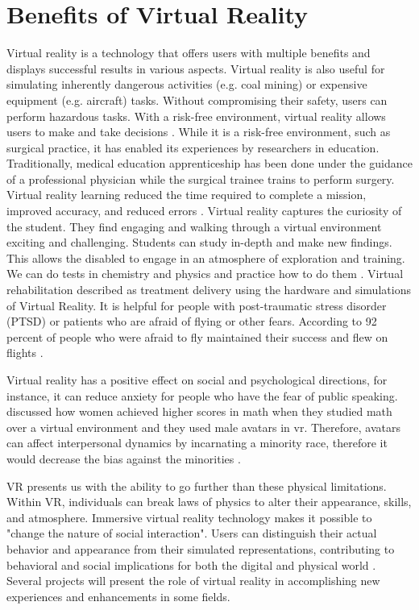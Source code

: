   
\section{Benefits of Virtual Reality}

Virtual reality is a technology that offers users with multiple benefits and displays successful results in various aspects. Virtual reality is also useful for simulating inherently dangerous activities (e.g. coal mining) or expensive equipment (e.g. aircraft) tasks. Without compromising their safety, users can perform hazardous tasks. With a risk-free environment, virtual reality allows users to make and take decisions \citep{Aguinas2004}. While it is a risk-free environment, such as surgical practice, it has enabled its experiences by researchers in education. Traditionally, medical education apprenticeship has been done under the guidance of a professional physician while the surgical trainee trains to perform surgery. Virtual reality learning reduced the time required to complete a mission, improved accuracy, and reduced errors \citep{Ks2009}. Virtual reality captures the curiosity of the student. They find engaging and walking through a virtual environment exciting and challenging. Students can study in-depth and make new findings. This allows the disabled to engage in an atmosphere of exploration and training. We can do tests in chemistry and physics and practice how to do them \citep{Pantelidis2010}. Virtual rehabilitation described as treatment delivery using the hardware and simulations of Virtual Reality. It is helpful for people with post-traumatic stress disorder (PTSD) or patients who are afraid of flying or other fears. According to 
\cite{Burdea2003} 92 percent of people who were afraid to fly maintained their success and flew on flights \citep{Burdea2003}.

Virtual reality has a positive effect on social and psychological directions, for instance, it can reduce anxiety for people who have the fear of public speaking. \cite{Chang2019StereotypeOutcomes} discussed how women achieved higher scores in math when they studied math over a virtual environment and they used male avatars in \acrshort{vr}. Therefore, avatars can affect interpersonal dynamics by incarnating a minority race, therefore it would decrease the bias against the minorities \citep{Markowitz2018ImmersiveChange, Chang2019StereotypeOutcomes}.   

 VR presents us with the ability to go further than these physical limitations. Within VR, individuals can break laws of physics to alter their appearance, skills, and atmosphere. Immersive virtual reality technology makes it possible to "change the nature of social interaction". Users can distinguish their actual behavior and appearance from their simulated representations, contributing to behavioral and social implications for both the digital and physical world \citep{Shriram2017VirtualBehavior}.
Several projects will present the role of virtual reality in accomplishing new experiences and enhancements in some fields.

